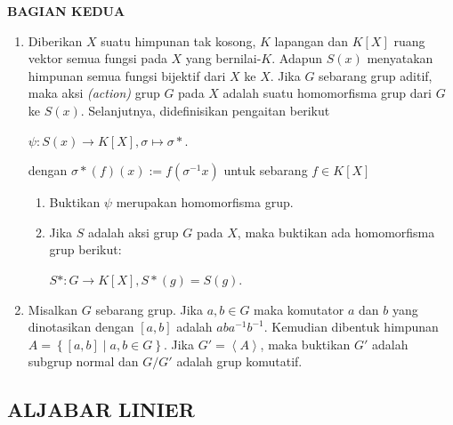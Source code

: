 \documentclass[12pt,twoside]{article}
\begin{document}
\newpage \textbf{BAGIAN KEDUA}
\begin{enumerate}
	\item Diberikan $X$ suatu himpunan tak kosong, $K$ lapangan dan $K[X]$ ruang vektor semua fungsi pada $X$ yang bernilai-$K$. Adapun $S(x)$ menyatakan himpunan semua fungsi bijektif dari $X$ ke $X$. Jika $G$ sebarang grup aditif, maka aksi \textit{(action)} grup $G$ pada $X$ adalah suatu homomorfisma grup dari $G$ ke $S(x)$. Selanjutnya, didefinisikan pengaitan berikut
	      \begin{center}
		      $\psi : S(x) \to K[X], \sigma \mapsto \sigma\ast$.
	      \end{center}
	      dengan $\sigma\ast(f)(x):= f(\sigma ^{-1}x)$ untuk sebarang $f \in K[X]$
	      \begin{enumerate}
		      \item Buktikan $\psi$ merupakan homomorfisma grup.
		      \item Jika $S$ adalah aksi grup $G$ pada $X$, maka buktikan ada homomorfisma grup berikut:
		            \begin{center}
			            $S\ast : G \to K[X],  S\ast (g) = S(g)$.
		            \end{center}
	      \end{enumerate}


	\item Misalkan $G$ sebarang grup. Jika $a,b \in G$ maka komutator $a$ dan $b$ yang dinotasikan dengan $\left[a,b\right]$ adalah $aba^{-1}b^{-1}$. Kemudian dibentuk himpunan $A = \left\lbrace \left[a,b\right] \mid a,b \in G \right\rbrace$. Jika $G' = \left<A\right>$, maka buktikan $G'$ adalah subgrup normal dan $G/G'$ adalah grup komutatif.

\end{enumerate}
\newpage \subsection{ALJABAR LINIER}
\end{document}
